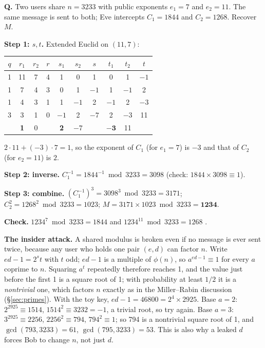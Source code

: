 \begin{worked}
\textbf{Q.} Two users share $n = 3233$ with public exponents $e_1 = 7$ and $e_2 = 11$. The same message is sent to both; Eve intercepts $C_1 = 1844$ and $C_2 = 1268$. Recover $M$.

\textbf{Step 1: $s, t$.} Extended Euclid on $(11, 7)$:
\begin{center}\small
\begin{tabular}{@{}c|ccc|ccc|ccc@{}}
\toprule
$q$ & $r_1$ & $r_2$ & $r$ & $s_1$ & $s_2$ & $s$ & $t_1$ & $t_2$ & $t$\\
\midrule
1 & 11 & 7 & 4 & 1 & 0 & 1 & 0 & 1 & $-1$\\
1 & 7 & 4 & 3 & 0 & 1 & $-1$ & 1 & $-1$ & 2\\
1 & 4 & 3 & 1 & 1 & $-1$ & 2 & $-1$ & 2 & $-3$\\
3 & 3 & 1 & 0 & $-1$ & 2 & $-7$ & 2 & $-3$ & 11\\
 & \textbf{1} & 0 & & \textbf{2} & $-7$ & & $\mathbf{-3}$ & 11 & \\
\bottomrule
\end{tabular}
\end{center}
$2 \cdot 11 + (-3) \cdot 7 = 1$, so the exponent of $C_1$ (for $e_1 = 7$) is $-3$ and that of $C_2$ (for $e_2 = 11$) is $2$.

\textbf{Step 2: inverse.} $C_1^{-1} = 1844^{-1} \bmod 3233 = 3098$ (check: $1844 \times 3098 \equiv 1$).

\textbf{Step 3: combine.} $(C_1^{-1})^3 = 3098^3 \bmod 3233 = 3171$; \;$C_2^2 = 1268^2 \bmod 3233 = 1023$; \;$M = 3171 \times 1023 \bmod 3233 = \mathbf{1234}$.

\textbf{Check.} $1234^7 \bmod 3233 = 1844$ and $1234^{11} \bmod 3233 = 1268$ \checkmark.
\end{worked}

\textbf{The insider attack.} A shared modulus is broken even if no message is ever sent twice, because any user who holds one pair $(e, d)$ can factor $n$. Write $ed - 1 = 2^s t$ with $t$ odd; $ed - 1$ is a multiple of $\phi(n)$, so $a^{ed-1} \equiv 1$ for every $a$ coprime to $n$. Squaring $a^t$ repeatedly therefore reaches 1, and the value just before the first 1 is a square root of 1; with probability at least $1/2$ it is a \emph{nontrivial} one, which factors $n$ exactly as in the Miller--Rabin discussion (\S\ref{sec:primes}). With the toy key, $ed - 1 = 46800 = 2^4 \times 2925$. Base $a = 2$: $2^{2925} \equiv 1514$, $1514^2 \equiv 3232 = -1$, a trivial root, so try again. Base $a = 3$: $3^{2925} \equiv 2256$, $2256^2 \equiv 794$, $794^2 \equiv 1$; so 794 is a nontrivial square root of 1, and $\gcd(793, 3233) = 61$, $\gcd(795, 3233) = 53$. This is also why a leaked $d$ forces Bob to change $n$, not just $d$.

